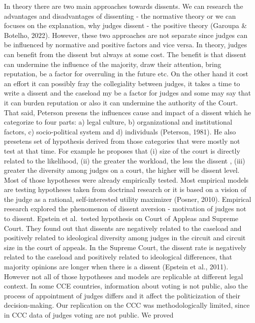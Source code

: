 \documentclass[
  11pt,
]{article}
\begin{document}
In theory there are two main approaches towards dissents. We can
research the advantages and disadvantages of dissenting - the normative
theory or we can focuses on the explanation, why judges dissent - the
positive theory (Garoupa \& Botelho, 2022). However, these two
approaches are not separate since judges can be influenced by normative
and positive factors and vice versa. In theory, judges can benefit from
the dissent but always at some cost. The benefit is that dissent can
undermine the influence of the majority, draw their attention, bring
reputation, be a factor for overruling in the future etc. On the other
hand it cost an effort it can possibly fray the collegiality between
judges, it takes a time to write a dissent and the caseload my be a
factor for judges and some may say that it can burden reputation or also
it can undermine the authority of the Court. That said, Peterson presens
the influences cause and impact of a dissent which he categorize to four
parts: a) legal culture, b) organizational and institutional factors, c)
socio-political system and d) individuals (Peterson, 1981). He also
presetens set of hypothesis derived from those categories that were
mostly not test at that time. For example he proposes that (i) size of
the court is directly related to the likelihood, (ii) the greater the
workload, the less the dissent , (iii) greater the diversity among
judges on a court, the higher will be dissent level. Most of those
hypotheses were already empirically tested. Most empirical models are
testing hypotheses taken from doctrinal research or it is based on a
vision of the judge as a rational, self-interested utility maximizer
(Posner, 2010). Empirical research explored the phenomenon of dissent
aversion - motivation of judges not to dissent. Epstein et al.~tested
hypothesis on Court of Appleas and Supreme Court. They found out that
dissents are negatively related to the caseload and positively related
to ideological diversity among judges in the circuit and circuit size in
the court of appeals. In the Supreme Court, the dissent rate is
negatively related to the caseload and positively related to ideological
differences, that majority opinions are longer when there is a dissent
(Epstein et al., 2011). However not all of those hypotheses and models
are replicable at different legal context. In some CCE countries,
information about voting is not public, also the process of appointment
of judges differs and it affect the politicization of their
decision-making. Our replication on the CCC was methodologically
limited, since in CCC data of judges voting are not public. We proved
\end{document}
